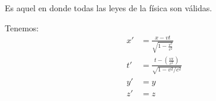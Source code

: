 \begin{definicion}
    Es aquel en donde todas las leyes de la física son válidas. 
\end{definicion}

\begin{definicion}
    Tenemos:
    \begin{align*}
        x' &=\frac{x-vt}{\sqrt{1-\frac{v^2}{c^2}}}\\
        t' &= \frac{t-(\frac{vx}{c^2})}{\sqrt{1-v^2/c^2}}\\
        y' &= y\\
        z' &= z
    \end{align*}
\end{definicion}